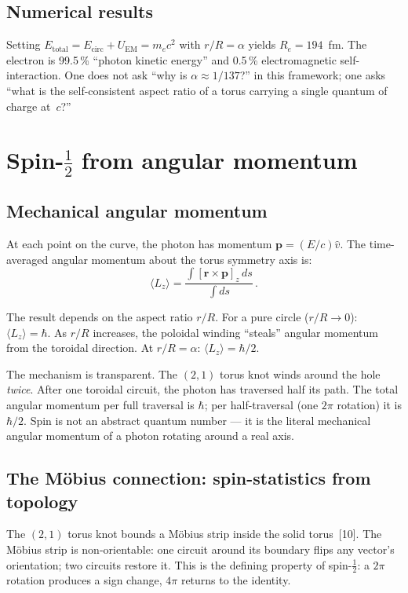 \documentclass[10pt,twoside,a5paper]{article}
\begin{document}
\subsection{Numerical results}

Setting $E_{\text{total}} = E_{\text{circ}} + U_{\text{EM}} = m_e c^2$ with $r/R = \alpha$ yields $R_e = 194$~fm. The electron is 99.5\,\% ``photon kinetic energy'' and 0.5\,\% electromagnetic self-interaction. One does not ask ``why is $\alpha \approx 1/137$?'' in this framework; one asks ``what is the self-consistent aspect ratio of a torus carrying a single quantum of charge at~$c$?''


\section{Spin-$\frac{1}{2}$ from angular momentum}

\subsection{Mechanical angular momentum}

At each point on the curve, the photon has momentum $\mathbf{p} = (E/c)\hat{v}$. The time-averaged angular momentum about the torus symmetry axis is:
\begin{equation}
  \langle L_z \rangle = \frac{\int [\mathbf{r} \times \mathbf{p}]_z\, ds}{\int ds}\,.
\end{equation}

The result depends on the aspect ratio $r/R$. For a pure circle ($r/R \to 0$): $\langle L_z \rangle = \hbar$. As $r/R$ increases, the poloidal winding ``steals'' angular momentum from the toroidal direction. At $r/R = \alpha$: $\langle L_z \rangle = \hbar/2$.

The mechanism is transparent. The $(2,1)$ torus knot winds around the hole \emph{twice}. After one toroidal circuit, the photon has traversed half its path. The total angular momentum per full traversal is $\hbar$; per half-traversal (one $2\pi$ rotation) it is $\hbar/2$. Spin is not an abstract quantum number --- it is the literal mechanical angular momentum of a photon rotating around a real axis.

\subsection{The M\"obius connection: spin-statistics from topology}

The $(2,1)$ torus knot bounds a M\"obius strip inside the solid torus~[10]. The M\"obius strip is non-orientable: one circuit around its boundary flips any vector's orientation; two circuits restore it. This is the defining property of spin-$\frac{1}{2}$: a $2\pi$ rotation produces a sign change, $4\pi$ returns to the identity.
\end{document}
